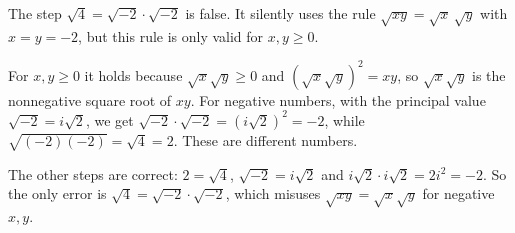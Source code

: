 The step $\sqrt4=\sqrt{-2}\cdot\sqrt{-2}$ is false. It silently uses the rule $\sqrt{xy}=\sqrt x\,\sqrt y$ with $x=y=-2$, but this rule is only valid for $x,y\ge0$.

For $x,y\ge0$ it holds because $\sqrt x\sqrt y\ge0$ and $\left(\sqrt x\sqrt y\right)^2=xy$, so $\sqrt x\sqrt y$ is the nonnegative square root of $xy$. For negative numbers, with the principal value $\sqrt{-2}=i\sqrt2$, we get $\sqrt{-2}\cdot\sqrt{-2}=\left(i\sqrt2\right)^2=-2$, while $\sqrt{(-2)(-2)}=\sqrt4=2$. These are different numbers.

The other steps are correct: $2=\sqrt4$, $\sqrt{-2}=i\sqrt2$ and $i\sqrt2\cdot i\sqrt2=2i^2=-2$. So the only error is $\boxed{\sqrt4=\sqrt{-2}\cdot\sqrt{-2}}$, which misuses $\sqrt{xy}=\sqrt x\sqrt y$ for negative $x,y$.
